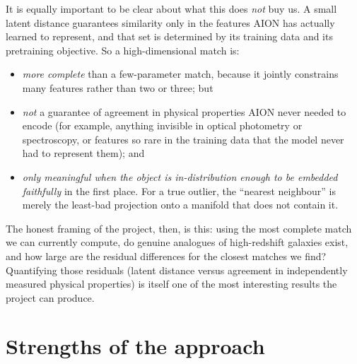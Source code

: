 \documentclass[onecolumn,astrosymb,tighten,longbib,trackchanges]{aastex7} %
\newcommand{\aion}{\textsc{AION}\xspace}
\begin{document}
It is equally important to be clear about what this does \emph{not} buy us. A small latent distance
guarantees similarity only in the features \aion has actually learned to represent, and that set is
determined by its training data and its pretraining objective. So a high-dimensional match is:
\begin{itemize}
  \item \emph{more complete} than a few-parameter match, because it jointly constrains many
        features rather than two or three; but
  \item \emph{not} a guarantee of agreement in physical properties \aion never needed to encode
        (for example, anything invisible in optical photometry or spectroscopy, or features so rare
        in the training data that the model never had to represent them); and
  \item \emph{only meaningful when the object is in-distribution enough to be embedded faithfully}
        in the first place. For a true outlier, the ``nearest neighbour'' is merely the least-bad
        projection onto a manifold that does not contain it.
\end{itemize}
The honest framing of the project, then, is this: using the most complete match we can currently
compute, do genuine analogues of high-redshift galaxies exist, and how large are the residual
differences for the closest matches we find? Quantifying those residuals (latent distance versus
agreement in independently measured physical properties) is itself one of the most interesting
results the project can produce.


\section{Strengths of the approach} \label{sec:strengths}
\end{document}
